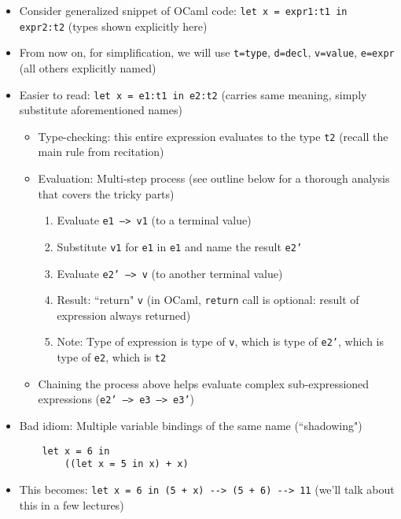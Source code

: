 \begin{itemize}
    \item Consider generalized snippet of \textsf{OCaml} code: \lstinline{let x = expr1:t1 in expr2:t2} (types shown explicitly here)
    \item From now on, for simplification, we will use \texttt{t=type}, \texttt{d=decl}, \texttt{v=value}, \texttt{e=expr} (all others explicitly named)
    \item Easier to read: \lstinline{let x = e1:t1 in e2:t2} (carries same meaning, simply substitute aforementioned names)
    \begin{itemize}
        \item Type-checking: this entire expression evaluates to the type \texttt{t2} (recall the main rule from recitation)
        \item Evaluation: Multi-step process (see outline below for a thorough analysis that covers the tricky parts)
        \begin{enumerate}
            \item Evaluate \texttt{e1 --> v1} (to a terminal value)
            \item Substitute \texttt{v1} for \texttt{e1} in \texttt{e1} and name the result \texttt{e2'}
            \item Evaluate \texttt{e2' --> v} (to another terminal value)
            \item Result: ``return" \texttt{v} (in \textsf{OCaml}, \texttt{return} call is optional: result of expression always returned)
            \item Note: Type of expression is type of \texttt{v}, which is type of \texttt{e2'}, which is type of \texttt{e2}, which is \texttt{t2}
        \end{enumerate}
        \item Chaining the process above helps evaluate complex sub-expressioned expressions (\texttt{e2' --> e3 --> e3'})
    \end{itemize}
    \item Bad idiom: Multiple variable bindings of the same name (``shadowing")
    \begin{lstlisting}
    let x = 6 in
        ((let x = 5 in x) + x) 
    \end{lstlisting}
    \item This becomes: \lstinline{let x = 6 in (5 + x) --> (5 + 6) --> 11} (we'll talk about this in a few lectures)
\end{itemize}